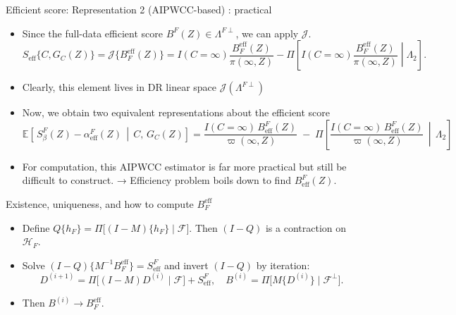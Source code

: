 \documentclass[xcolor=dvipsnames,aspectratio=169]{beamer}
\newcommand{\1}{\mathbbm{1}}
\begin{document}
\begin{frame}{Efficient score: Representation 2 (AIPWCC-based) : practical}
  \begin{itemize}
    \item Since the full-data efficient score $B^F(Z)\in \Lambda^{F\perp}$, we can apply $\mathcal{J}$.
  \[
    S_{\text{eff}}\{C,G_C(Z)\}=\mathcal{J}\big\{B_F^{\text{eff}}(Z)\big\}
    =I(C=\infty)\frac{B_F^{\text{eff}}(Z)}{\pi(\infty,Z)}-\Pi\!\left[I(C=\infty)\frac{B_F^{\text{eff}}(Z)}{\pi(\infty,Z)}\middle|\Lambda_2 \right].
  \]
  \item Clearly, this element lives in DR linear space $\mathcal{J}(\Lambda^{F\perp})$
  \item Now, we obtain two equivalent representations about the efficient score
  \[
  \mathbb{E}\!\left[\, S^{F}_{\beta}(Z) - \alpha^{F}_{\mathrm{eff}}(Z) \,\middle|\, C,\, G_{C}(Z) \right]
=
\frac{I(C=\infty)\, B^{F}_{\mathrm{eff}}(Z)}{\varpi(\infty, Z)}
\;-\;
\Pi\!\left[
  \frac{I(C=\infty)\, B^{F}_{\mathrm{eff}}(Z)}{\varpi(\infty, Z)}
  \,\middle|\, \Lambda_{2}
\right]
  \]
  \item For computation, this AIPWCC estimator is far more practical but still be difficult to construct. → Efficiency problem boils down to find $B^{F}_{\mathrm{eff}}(Z)$.
  \end{itemize}
\end{frame}

\begin{frame}{Existence, uniqueness, and how to compute $B_F^{\text{eff}}$}
  \begin{itemize}
    \item Define $Q\{h_F\}=\Pi\big[(I-M)\{h_F\}\mid \mathcal{F}\big]$. Then $(I-Q)$ is a contraction on $\mathcal{H}_F$.
    \item Solve $(I-Q)\{M^{-1}B_F^{\text{eff}}\}=S^F_{\text{eff}}$ and invert $(I-Q)$ by iteration:
    \[
      D^{(i+1)}=\Pi\big[(I-M)D^{(i)}\mid \mathcal{F}\big]+S^F_{\text{eff}},\quad 
      B^{(i)}=\Pi\big[M\{D^{(i)}\}\mid \mathcal{F}^{\perp}\big].
    \]
    \item Then $B^{(i)}\to B_F^{\text{eff}}$.
  \end{itemize}
\end{frame}
\end{document}
